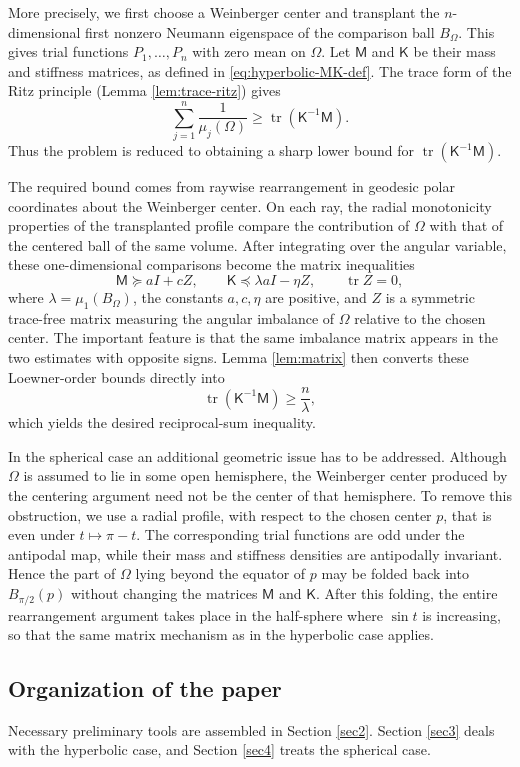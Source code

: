 \documentclass[11pt]{amsart}
\theoremstyle{remark}
\DeclareMathOperator{\tr}{tr}
\newcommand{\Id}{I}
\newcommand{\mcM}{\mathsf M}
\newcommand{\mcK}{\mathsf K}
\begin{document}
More precisely, we first choose a Weinberger center and transplant the
$n$-dimensional first nonzero Neumann eigenspace of the comparison ball
$B_\Omega$.  This gives trial functions $P_1,\dots,P_n$ with zero mean on
$\Omega$.  Let $\mcM$ and $\mcK$ be their mass and stiffness matrices, as
defined in \eqref{eq:hyperbolic-MK-def}.  The trace form of the Ritz principle
(Lemma \ref{lem:trace-ritz}) gives
$$
        \sum_{j=1}^n\frac1{\mu_j(\Omega)}
        \ge \tr(\mcK^{-1}\mcM).
$$
Thus the problem is reduced to obtaining a sharp lower bound for
$\tr(\mcK^{-1}\mcM)$.

The required bound comes from raywise rearrangement in geodesic polar
coordinates about the Weinberger center.  On each ray, the radial
monotonicity properties of the transplanted profile compare the contribution
of $\Omega$ with that of the centered ball of the same volume.  After
integrating over the angular variable, these one-dimensional comparisons
become the matrix inequalities
$$
        \mcM\succeq a\Id+cZ,
        \qquad
        \mcK\preceq \lambda a\Id-\eta Z,
        \qquad
        \tr Z=0,
$$
where $\lambda=\mu_1(B_\Omega)$, the constants $a,c,\eta$ are positive, and
$Z$ is a symmetric trace-free matrix measuring the angular imbalance of
$\Omega$ relative to the chosen center.  The important feature is that the
same imbalance matrix appears in the two estimates with opposite signs.
Lemma \ref{lem:matrix} then converts these Loewner-order bounds directly into
$$
        \tr(\mcK^{-1}\mcM)\ge \frac{n}{\lambda},
$$
which yields the desired reciprocal-sum inequality.

In the spherical case an additional geometric issue has to be addressed.
Although $\Omega$ is assumed to lie in some open hemisphere, the Weinberger
center produced by the centering argument need not be the center of that
hemisphere.  To remove this obstruction, we use a radial profile, with
respect to the chosen center $p$, that is even under $t\mapsto \pi-t$.  The
corresponding trial functions are odd under the antipodal map, while their
mass and stiffness densities are antipodally invariant.  Hence the part of
$\Omega$ lying beyond the equator of $p$ may be folded back into
$B_{\pi/2}(p)$ without changing the matrices $\mcM$ and $\mcK$.  After this
folding, the entire rearrangement argument takes place in the half-sphere
where $\sin t$ is increasing, so that the same matrix mechanism as in the
hyperbolic case applies.

\subsection{Organization of the paper}
Necessary preliminary tools are assembled in Section \ref{sec2}. Section \ref{sec3} deals with the hyperbolic case, and Section \ref{sec4} treats the spherical case.
\end{document}
